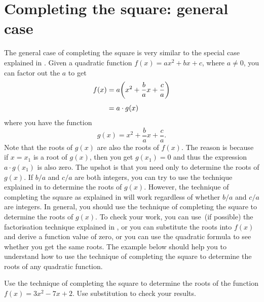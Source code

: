 \documentclass[a4paper,oneside,12pt]{article}
\begin{document}

\section{Completing the square: general case}

The general case of completing the square is very similar to the
special case explained
in .  Given a
quadratic function $f(x) = ax^2 + bx + c$, where $a \neq 0$, you can
factor out the $a$ to get
\begin{align*}
f(x)
&=
a
\parenthesis*{
  x^2 + \frac{b}{a}x + \frac{c}{a}
} \\[4pt]
&=
a \cdot g(x)
\end{align*}
where you have the function
\[
g(x)
=
x^2 + \frac{b}{a}x + \frac{c}{a}.
\]
Note that the roots of $g(x)$ are also the roots of $f(x)$.  The
reason is because if $x = x_1$ is a root of $g(x)$, then you get
$g(x_1) = 0$ and thus the expression $a \cdot g(x_1)$ is also zero.
The upshot is that you need only to determine the roots of $g(x)$.  If
$b / a$ and $c / a$ are both integers, you can try to use the
technique explained in  to determine
the roots of $g(x)$.  However, the technique of completing the square
as explained in  will
work regardless of whether $b / a$ and $c / a$ are integers.  In
general, you should use the technique of completing the square to
determine the roots of $g(x)$.  To check your work, you can use~(if
possible) the factorisation technique explained
in , or you can substitute the roots
into $f(x)$ and derive a function value of zero, or you can use the
quadratic formula to see whether you get the same roots.  The example
below should help you to understand how to use the technique of
completing the square to determine the roots of any quadratic
function.

\begin{example}
\label{eg:completing_square_a3_bminus7_c2}
Use the technique of completing the square to determine the roots of
the function $f(x) = 3x^2 - 7x + 2$.  Use substitution to check your
results.
\end{example}
\end{document}
